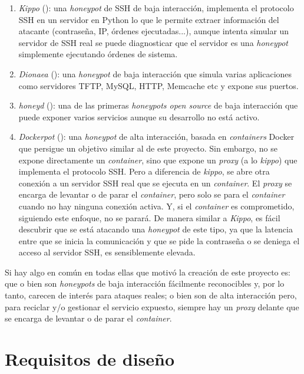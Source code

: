 \begin{enumerate}
    \item \emph{Kippo} (\cite{honeynet-kippo}): una \emph{honeypot} de SSH de baja interacción, implementa el protocolo SSH en un servidor en Python
    lo que le permite extraer información del atacante (contraseña, IP, órdenes ejecutadas...), aunque intenta simular un servidor de SSH real
    se puede diagnosticar que el servidor es una \emph{honeypot} simplemente ejecutando órdenes de sistema.
    \item \emph{Dionaea} (\cite{honeynet-dionaea}): una \emph{honeypot} de baja interacción que simula varias aplicaciones como servidores TFTP, MySQL, HTTP, Memcache etc y expone sus puertos.
    \item \emph{honeyd} (\cite{honeynet-lowinteraction}): una de las primeras \emph{honeypots open source} de baja interacción que puede exponer varios servicios aunque su desarrollo no está activo.
    \item \emph{Dockerpot} (\cite{honeynet-dockpot}): una \emph{honeypot} de alta interacción, basada en \emph{containers} Docker que persigue un objetivo similar al de este proyecto.
    Sin embargo, no se expone directamente un \emph{container}, sino que expone un \emph{proxy} (a lo \emph{kippo}) que implementa el protocolo SSH. Pero a diferencia de \emph{kippo}, se abre otra conexión
    a un servidor SSH real que se ejecuta en un \emph{container}. El \emph{proxy} se encarga de levantar o de parar el \emph{container}, pero solo se para el \emph{container} cuando no hay ninguna conexión activa. Y, si el \emph{container} es comprometido, siguiendo este enfoque, no se parará.
    De manera similar a \emph{Kippo}, es fácil descubrir  que se está atacando una \emph{honeypot} de este tipo, ya que la latencia entre que se inicia la comunicación
    y que se pide la contraseña o se deniega el acceso al servidor SSH, es sensiblemente elevada.
\end{enumerate}

Si hay algo en común en todas ellas que motivó la creación de este proyecto es: que o bien son \emph{honeypots} de baja interacción fácilmente reconocibles
y, por lo tanto, carecen de interés para ataques reales; o bien son de alta interacción pero, para reciclar y/o gestionar el servicio expuesto, siempre hay un \emph{proxy} delante
que se encarga de levantar o de parar el \emph{container}.

\section{Requisitos de diseño}
\label{sec:requisitos-de-disenyo}

